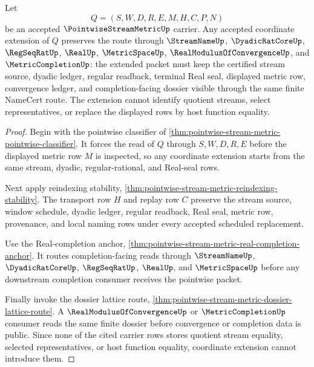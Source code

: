 \begin{theorem}
\label{thm:pointwise-stream-metric-coordinate-extension-stability}
Let
$$
Q=(S,W,D,R,E,M,H,C,P,N)
$$
be an accepted $\PointwiseStreamMetricUp$ carrier. Any accepted coordinate extension of $Q$ preserves the route through $\StreamNameUp$, $\DyadicRatCoreUp$, $\RegSeqRatUp$, $\RealUp$, $\MetricSpaceUp$, $\RealModulusOfConvergenceUp$, and $\MetricCompletionUp$: the extended packet must keep the certified stream source, dyadic ledger, regular readback, terminal Real seal, displayed metric row, convergence ledger, and completion-facing dossier visible through the same finite NameCert route. The extension cannot identify quotient streams, select representatives, or replace the displayed rows by host function equality.
\end{theorem}
\begin{proof}
Begin with the pointwise classifier of \autoref{thm:pointwise-stream-metric-pointwise-classifier}. It forces the read of $Q$ through $S,W,D,R,E$ before the displayed metric row $M$ is inspected, so any coordinate extension starts from the same stream, dyadic, regular-rational, and Real-seal rows.

Next apply reindexing stability, \autoref{thm:pointwise-stream-metric-reindexing-stability}. The transport row $H$ and replay row $C$ preserve the stream source, window schedule, dyadic ledger, regular readback, Real seal, metric row, provenance, and local naming rows under every accepted scheduled replacement.

Use the Real-completion anchor, \autoref{thm:pointwise-stream-metric-real-completion-anchor}. It routes completion-facing reads through $\StreamNameUp$, $\DyadicRatCoreUp$, $\RegSeqRatUp$, $\RealUp$, and $\MetricSpaceUp$ before any downstream completion consumer receives the pointwise packet.

Finally invoke the dossier lattice route, \autoref{thm:pointwise-stream-metric-dossier-lattice-route}. A $\RealModulusOfConvergenceUp$ or $\MetricCompletionUp$ consumer reads the same finite dossier before convergence or completion data is public. Since none of the cited carrier rows stores quotient stream equality, selected representatives, or host function equality, coordinate extension cannot introduce them.
\end{proof}
